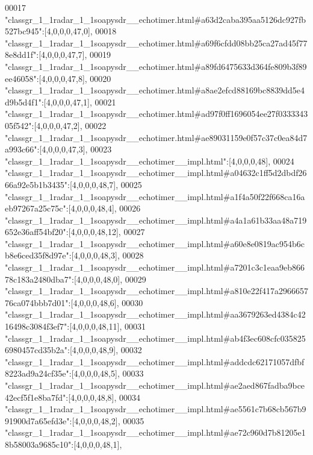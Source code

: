 \begin{DoxyCode}
00017 \textcolor{stringliteral}{"classgr\_1\_1radar\_1\_1soapysdr\_\_echotimer.html#a63d2caba395aa5126dc927fb527bc945"}:[4,0,0,0,47,0],
00018 \textcolor{stringliteral}{"classgr\_1\_1radar\_1\_1soapysdr\_\_echotimer.html#a69f6cfdd08bb25ca27ad45f778e8dd1f"}:[4,0,0,0,47,7],
00019 \textcolor{stringliteral}{"classgr\_1\_1radar\_1\_1soapysdr\_\_echotimer.html#a89fd6475633d364fe809b3f89ee46058"}:[4,0,0,0,47,8],
00020 \textcolor{stringliteral}{"classgr\_1\_1radar\_1\_1soapysdr\_\_echotimer.html#a8ae2efcd88169bc8839dd5e4d9b5d4f1"}:[4,0,0,0,47,1],
00021 \textcolor{stringliteral}{"classgr\_1\_1radar\_1\_1soapysdr\_\_echotimer.html#ad97f0ff1696054ee27f033334305f542"}:[4,0,0,0,47,2],
00022 \textcolor{stringliteral}{"classgr\_1\_1radar\_1\_1soapysdr\_\_echotimer.html#ae89031159e0f57c37c0ea84d7a993c66"}:[4,0,0,0,47,3],
00023 \textcolor{stringliteral}{"classgr\_1\_1radar\_1\_1soapysdr\_\_echotimer\_\_impl.html"}:[4,0,0,0,48],
00024 \textcolor{stringliteral}{"classgr\_1\_1radar\_1\_1soapysdr\_\_echotimer\_\_impl.html#a04632c1ff5d2dbdf2666a92e5b1b3435"}:[4,0,0,0,48,7],
00025 \textcolor{stringliteral}{"classgr\_1\_1radar\_1\_1soapysdr\_\_echotimer\_\_impl.html#a1f4a50f22f668ca16aeb97267a25c75c"}:[4,0,0,0,48,4],
00026 \textcolor{stringliteral}{"classgr\_1\_1radar\_1\_1soapysdr\_\_echotimer\_\_impl.html#a4a1a61b33aa48a719652e36aff54bf20"}:[4,0,0,0,48,12],
00027 \textcolor{stringliteral}{"classgr\_1\_1radar\_1\_1soapysdr\_\_echotimer\_\_impl.html#a60e8e0819ac954b6cb8e6ced35f8d97e"}:[4,0,0,0,48,3],
00028 \textcolor{stringliteral}{"classgr\_1\_1radar\_1\_1soapysdr\_\_echotimer\_\_impl.html#a7201c3c1eaa9eb86678c183a2480dba7"}:[4,0,0,0,48,0],
00029 \textcolor{stringliteral}{"classgr\_1\_1radar\_1\_1soapysdr\_\_echotimer\_\_impl.html#a810e22f417a296665776ca074bbb7d01"}:[4,0,0,0,48,6],
00030 \textcolor{stringliteral}{"classgr\_1\_1radar\_1\_1soapysdr\_\_echotimer\_\_impl.html#aa3679263ed4384c4216498c3084f3ef7"}:[4,0,0,0,48,11],
00031 \textcolor{stringliteral}{"classgr\_1\_1radar\_1\_1soapysdr\_\_echotimer\_\_impl.html#ab4f3ec608cfc0358256980457cd35b2a"}:[4,0,0,0,48,9],
00032 \textcolor{stringliteral}{"classgr\_1\_1radar\_1\_1soapysdr\_\_echotimer\_\_impl.html#addcdc62171057dfbf8223ad9a24cf35e"}:[4,0,0,0,48,5],
00033 \textcolor{stringliteral}{"classgr\_1\_1radar\_1\_1soapysdr\_\_echotimer\_\_impl.html#ae2aed867fadba9bce42ecf5f1e8ba7fd"}:[4,0,0,0,48,8],
00034 \textcolor{stringliteral}{"classgr\_1\_1radar\_1\_1soapysdr\_\_echotimer\_\_impl.html#ae5561c7b68cb567b991900d7a65efd3e"}:[4,0,0,0,48,2],
00035 \textcolor{stringliteral}{"classgr\_1\_1radar\_1\_1soapysdr\_\_echotimer\_\_impl.html#ae72c960d7b81205e18b58003a9685c10"}:[4,0,0,0,48,1],

\end{DoxyCode}
